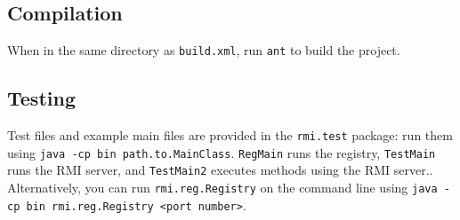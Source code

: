 \documentclass{scrartcl}
\begin{document}
\subsection{Compilation}

When in the same directory as \verb$build.xml$, run \verb$ant$ to build the project.

\subsection{Testing}

Test files and example main files are provided in the \verb$rmi.test$ package: run them using \verb$java -cp bin path.to.MainClass$.  \verb$RegMain$ runs the registry, \verb$TestMain$ runs the RMI server, and \verb$TestMain2$ executes methods using the RMI server.. Alternatively, you can run \verb$rmi.reg.Registry$ on the command line using \verb$java -cp bin rmi.reg.Registry <port number>$.
\end{document}
